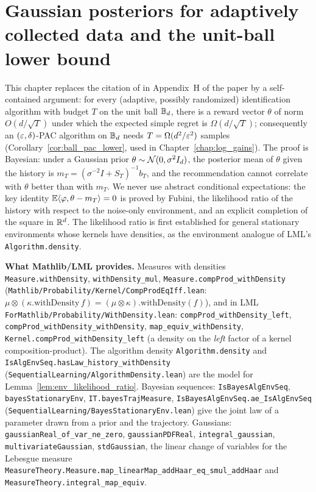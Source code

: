 \chapter{Gaussian posteriors for adaptively collected data and the unit-ball lower bound}
\label{chap:pre_bayes}

This chapter replaces the citation of \cite{chen2024assouad} in Appendix~H of the paper by a
self-contained argument: for every (adaptive, possibly randomized) identification algorithm
with budget $T$ on the unit ball $\mathbb{B}_d$, there is a reward vector $\theta$ of norm
$O(d/\sqrt T)$ under which the expected simple regret is $\Omega(d/\sqrt T)$; consequently an
$(\varepsilon,\delta)$-PAC algorithm on $\mathbb{B}_d$ needs $T = \Omega(d^2/\varepsilon^2)$ samples
(Corollary~\ref{cor:ball_pac_lower}, used in Chapter~\ref{chap:log_gains}). The proof is
Bayesian: under a Gaussian prior $\theta\sim\mathcal{N}(0,\sigma^2I_d)$, the posterior mean of
$\theta$ given the history is $m_T = (\sigma^{-2}I+S_T)^{-1}b_T$, and the recommendation cannot
correlate with $\theta$ better than with $m_T$. We never use abstract conditional expectations:
the key identity $\mathbb{E}\langle \varphi, \theta-m_T \rangle = 0$ is proved by Fubini, the likelihood ratio of
the history with respect to the noise-only environment, and an explicit completion of the
square in $\mathbb{R}^d$. The likelihood ratio is first established for general stationary environments
whose kernels have densities, as the environment analogue of LML's \texttt{Algorithm.density}.

\textbf{What Mathlib/LML provides.} Measures with densities \texttt{Measure.withDensity},
\texttt{withDensity\_mul}, \texttt{Measure.compProd\_withDensity}
(\texttt{Mathlib/Probability/Kernel/CompProdEqIff.lean}: $\mu\otimes(\kappa.\mathrm{withDensity}\,f) = (\mu\otimes\kappa).\mathrm{withDensity}(f)$),
and in LML \texttt{ForMathlib/Probability/WithDensity.lean}: \texttt{compProd\_withDensity\_left},
\texttt{compProd\_withDensity\_withDensity}, \texttt{map\_equiv\_withDensity},
\texttt{Kernel.compProd\_withDensity\_left} (a density on the \emph{left} factor of a kernel
composition-product). The algorithm density
\texttt{Algorithm.density} and \texttt{IsAlgEnvSeq.hasLaw\_history\_withDensity}
(\texttt{SequentialLearning/AlgorithmDensity.lean}) are the model for
Lemma~\ref{lem:env_likelihood_ratio}. Bayesian sequences: \texttt{IsBayesAlgEnvSeq},
\texttt{bayesStationaryEnv}, \texttt{IT.bayesTrajMeasure}, \texttt{IsBayesAlgEnvSeq.ae\_IsAlgEnvSeq}
(\texttt{SequentialLearning/BayesStationaryEnv.lean}) give the joint law of a parameter drawn
from a prior and the trajectory. Gaussians: \texttt{gaussianReal\_of\_var\_ne\_zero},
\texttt{gaussianPDFReal}, \texttt{integral\_gaussian}, \texttt{multivariateGaussian},
\texttt{stdGaussian}, the linear change of variables for the Lebesgue measure
\texttt{MeasureTheory.Measure.map\_linearMap\_addHaar\_eq\_smul\_addHaar} and
\texttt{MeasureTheory.integral\_map\_equiv}.

